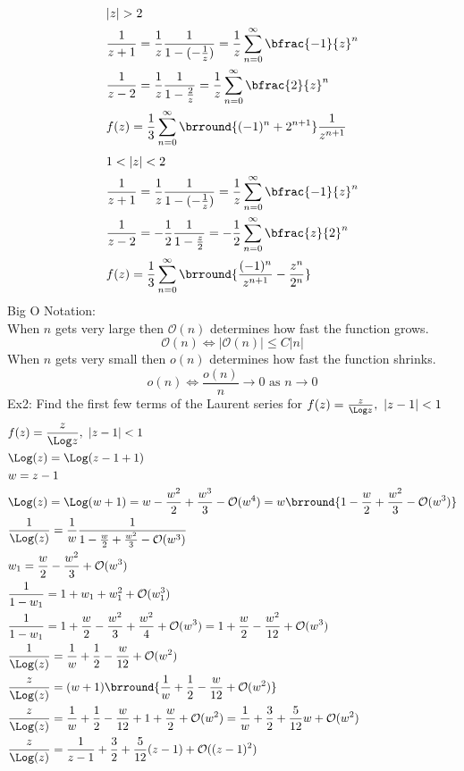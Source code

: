 \begin{align*}
    &|z|>2\\
    &\frac{1}{z+1}=\frac{1}{z}\frac{1}{1-(-\frac{1}{z})}=\frac{1}{z}\sum_{n=0}^\infty\bfrac{-1}{z}^n\\
    &\frac{1}{z-2}=\frac{1}{z}\frac{1}{1-\frac{2}{z}}=\frac{1}{z}\sum_{n=0}^\infty\bfrac{2}{z}^n\\
    &f(z)=\frac{1}{3}\sum_{n=0}^\infty\brround{(-1)^n+2^{n+1}}\frac{1}{z^{n+1}}
\end{align*}
\begin{align*}
    &1<|z|<2\\
    &\frac{1}{z+1}=\frac{1}{z}\frac{1}{1-(-\frac{1}{z})}=\frac{1}{z}\sum_{n=0}^\infty\bfrac{-1}{z}^n\\
    &\frac{1}{z-2}=-\frac{1}{2}\frac{1}{1-\frac{z}{2}}=-\frac{1}{2}\sum_{n=0}^\infty\bfrac{z}{2}^n\\
    &f(z)=\frac{1}{3}\sum_{n=0}^\infty\brround{\frac{(-1)^n}{z^{n+1}}-\frac{z^n}{2^{n}}}
\end{align*}
Big O Notation:\\
When $n$ gets very large then $\mathcal{O}(n)$ determines how fast the function grows.
\[\mathcal{O}(n)\Leftrightarrow |\mathcal{O}(n)|\leq C|n|\]
When $n$ gets very small then $o(n)$ determines how fast the function shrinks.
\[o(n)\Leftrightarrow \frac{o(n)}{n}\to 0\text{ as }n\to 0\]
Ex2: Find the first few terms of the Laurent series for $f(z)=\frac{z}{\Log z},\ |z-1|<1$
\begin{align*}
    &f(z)=\frac{z}{\Log z},\ |z-1|<1\\
    &\Log(z)=\Log(z-1+1)\\
    &w=z-1\\
    &\Log(z)=\Log(w+1)=w-\frac{w^2}{2}+\frac{w^3}{3}-\mathcal{O}(w^4)=w\brround{1-\frac{w}{2}+\frac{w^2}{3}-\mathcal{O}(w^3)}\\
    &\frac{1}{\Log(z)}=\frac{1}{w}\frac{1}{1-\frac{w}{2}+\frac{w^2}{3}-\mathcal{O}(w^3)}\\
    &w_1=\frac{w}{2}-\frac{w^2}{3}+\mathcal{O}(w^3)\\
    &\frac{1}{1-w_1}=1+w_1+w_1^2+\mathcal{O}(w_1^3)\\
    &\frac{1}{1-w_1}=1+\frac{w}{2}-\frac{w^2}{3}+\frac{w^2}{4}+\mathcal{O}(w^3)=1+\frac{w}{2}-\frac{w^2}{12}+\mathcal{O}(w^3)\\
    &\frac{1}{\Log(z)}=\frac{1}{w}+\frac{1}{2}-\frac{w}{12}+\mathcal{O}(w^2)\\
    &\frac{z}{\Log(z)}=(w+1)\brround{\frac{1}{w}+\frac{1}{2}-\frac{w}{12}+\mathcal{O}(w^2)}\\
    &\frac{z}{\Log(z)}=\frac{1}{w}+\frac{1}{2}-\frac{w}{12}+1+\frac{w}{2}+\mathcal{O}(w^2)=\frac{1}{w}+\frac{3}{2}+\frac{5}{12}w+\mathcal{O}(w^2)\\
    &\frac{z}{\Log(z)}=\frac{1}{z-1}+\frac{3}{2}+\frac{5}{12}(z-1)+\mathcal{O}((z-1)^2)
\end{align*}
